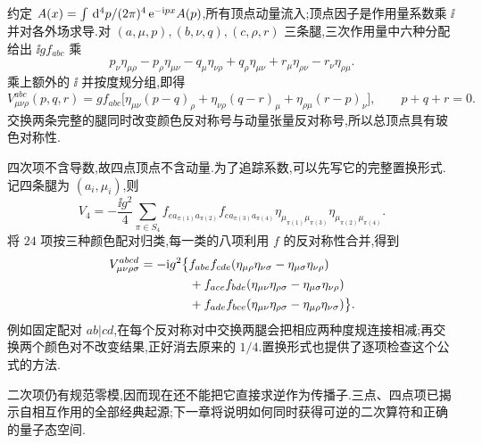 约定 $A(x)=\int\,\mathrm d^4p/(2\pi)^4\,\mathrm e^{-\mathrm i px}A(p)$,所有顶点动量流入;顶点因子是作用量系数乘 $\ii$ 并对各外场求导.对 $(a,\mu,p),(b,\nu,q),(c,\rho,r)$ 三条腿,三次作用量中六种分配给出 $\ii gf_{abc}$ 乘
\[
 p_\nu\eta_{\mu\rho}-p_\rho\eta_{\mu\nu}
 -q_\mu\eta_{\nu\rho}+q_\rho\eta_{\mu\nu}
 +r_\mu\eta_{\rho\nu}-r_\nu\eta_{\rho\mu}.
\]
乘上额外的 $\ii$ 并按度规分组,即得
\begin{equation}\label{eq:ym-three-vertex}
 V^{abc}_{\mu\nu\rho}(p,q,r)=gf_{abc}
 \bigl[\eta_{\mu\nu}(p-q)_\rho+\eta_{\nu\rho}(q-r)_\mu
 +\eta_{\rho\mu}(r-p)_\nu\bigr],\qquad p+q+r=0.
\end{equation}
交换两条完整的腿同时改变颜色反对称号与动量张量反对称号,所以总顶点具有玻色对称性.

四次项不含导数,故四点顶点不含动量.为了追踪系数,可以先写它的完整置换形式.记四条腿为 $(a_i,\mu_i)$,则
\[
 V_4=-\frac{\ii g^2}{4}\sum_{\pi\in S_4}
 f_{e a_{\pi(1)}a_{\pi(2)}}f_{e a_{\pi(3)}a_{\pi(4)}}
 \eta_{\mu_{\pi(1)}\mu_{\pi(3)}}\eta_{\mu_{\pi(2)}\mu_{\pi(4)}}.
\]
将 $24$ 项按三种颜色配对归类,每一类的八项利用 $f$ 的反对称性合并,得到
\begin{align}\label{eq:ym-four-vertex}
 V^{abcd}_{\mu\nu\rho\sigma}=-\mathrm i g^2\bigl\{&
 f_{abe}f_{cde}(\eta_{\mu\rho}\eta_{\nu\sigma}-\eta_{\mu\sigma}\eta_{\nu\rho})\notag\\
 &+f_{ace}f_{bde}(\eta_{\mu\nu}\eta_{\rho\sigma}-\eta_{\mu\sigma}\eta_{\nu\rho})\\
 &+f_{ade}f_{bce}(\eta_{\mu\nu}\eta_{\rho\sigma}-\eta_{\mu\rho}\eta_{\nu\sigma})\bigr\}.\notag
\end{align}
例如固定配对 $ab|cd$,在每个反对称对中交换两腿会把相应两种度规连接相减;再交换两个颜色对不改变结果,正好消去原来的 $1/4$.置换形式也提供了逐项检查这个公式的方法.

二次项仍有规范零模,因而现在还不能把它直接求逆作为传播子.三点、四点项已揭示自相互作用的全部经典起源;下一章将说明如何同时获得可逆的二次算符和正确的量子态空间.
